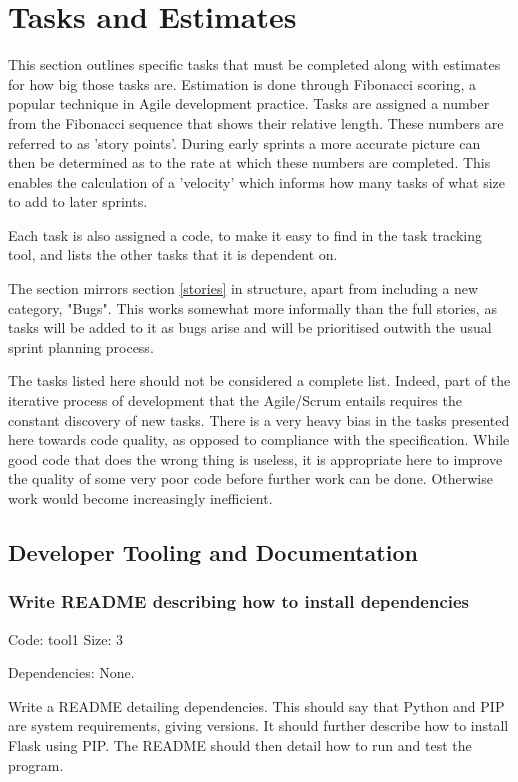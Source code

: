 \documentclass[a4paper,12pt]{article}
\begin{document}
\section{Tasks and Estimates}
This section outlines specific tasks that must be completed along with estimates for how big those tasks are. Estimation is done through Fibonacci scoring, a popular technique in Agile development practice. Tasks are assigned a number from the Fibonacci sequence that shows their relative length. These numbers are referred to as 'story points'. During early sprints a more accurate picture can then be determined as to the rate at which these numbers are completed. This enables the calculation of a 'velocity' which informs how many tasks of what size to add to later sprints.

Each task is also assigned a code, to make it easy to find in the task tracking tool, and lists the other tasks that it is dependent on.

The section mirrors section \ref{stories} in structure, apart from including a new category, "Bugs". This works somewhat more informally than the full stories, as tasks will be added to it as bugs arise and will be prioritised outwith the usual sprint planning process.

The tasks listed here should not be considered a complete list. Indeed, part of the iterative process of development that the Agile/Scrum entails requires the constant discovery of new tasks. There is a very heavy bias in the tasks presented here towards code quality, as opposed to compliance with the specification. While good code that does the wrong thing is useless, it is appropriate here to improve the quality of some very poor code before further work can be done. Otherwise work would become increasingly inefficient.

\subsection{Developer Tooling and Documentation}
\subsubsection{Write README describing how to install dependencies}
Code: tool1	\hfill Size: 3

Dependencies: None.

Write a README detailing dependencies. This should say that Python and PIP are system requirements, giving versions. It should further describe how to install Flask using PIP. The README should then detail how to run and test the program.
\end{document}
